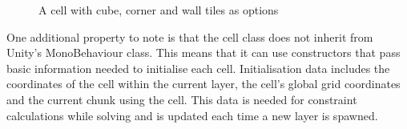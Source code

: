 \begin{figure}[H]
    \centering

    \vspace{\baselineskip} %

    \hfill
    \hfill
    \caption{A cell with cube, corner and wall tiles as options}
    \label{fig:tileOptions}
\end{figure}

One additional property to note is that the cell class does not inherit from Unity's MonoBehaviour class. This means that it can use constructors that pass basic information needed to initialise each cell. Initialisation data includes the coordinates of the cell within the current layer, the cell's global grid coordinates and the current chunk using the cell. This data is needed for constraint calculations while solving and is updated each time a new layer is spawned.

